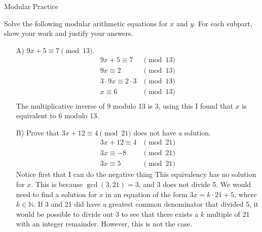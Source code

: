 \begin{homeworkProblem}{Modular Practice}

    Solve the following modular arithmetic equations for $x$ and $y$. For each 
    subpart, show your work and justify your answers.

    \begin{itemize}
        \item[A)] $9x+5 \equiv 7 \pmod{13}$.
        \[
            \begin{split}      
                9x + 5 \equiv 7 & \pmod{13} \\
                9x \equiv 2 & \pmod{13} \\
                3 \cdot 9x \equiv 2 \cdot 3 & \pmod{13} \\
                x \equiv 6 & \pmod{13} \\
            \end{split}
        \]
        The multiplicative inverse of 9 modulo 13 is 3, using this I found that
        $x$ is equivalent to 6 modulo 13. 

        \item[B)] Prove that $3x+12 \equiv 4 \pmod{21}$ does not have a solution.
        \[
            \begin{split}
                3x + 12 \equiv 4 & \pmod{21} \\
                3x \equiv -8 & \pmod{21} \\
                3x \equiv 5 & \pmod{21}
            \end{split}
        \]
        Notice first that I can do the negative thing 
        This equivalency has no solution for $x$. This is because $\gcd(3, 21) = 3$,
        and 3 does not divide 5. We would need to find a solution for $x$ in an 
        equation of the form $3x = k \cdot 21 + 5$, where $k \in \mathbb{N}$. If 3
        and 21 did have a greatest common denominator that divided 5, it would be 
        possible to divide out 3 to see that there exists a $k$ multiple of 21 with
        an integer remainder. However, this is not the case. 


\end{itemize}
\end{homeworkProblem}
